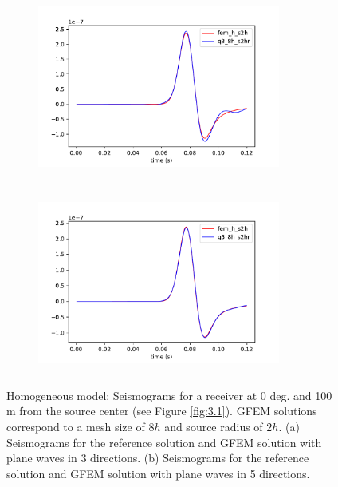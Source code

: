  \begin{figure}[h!]
 		\centering
		\begin{subfigure}{8cm}
				\includegraphics[width=8cm, height=6cm]{Thesis_Edith/figures/homo/homo_waves/fem_q3_8h_2hr_r100_0deg.pdf}
			     \caption{}
		\end{subfigure}
        \hspace{0.25cm}
		\begin{subfigure}{8cm}
				\includegraphics[width=8cm, height=6cm]{Thesis_Edith/figures/homo/homo_waves/fem_q5_8h_2hr_r100_0deg.pdf}
			   \caption{}
		\end{subfigure}
 
	\caption{Homogeneous model: Seismograms for a receiver at 0 deg. and 100 m from the source center (see Figure \ref{fig:3.1}). GFEM solutions correspond to a mesh size of $8h$ and source radius of $2h$. (a) Seismograms for the reference solution and GFEM solution with plane waves in 3 directions. (b) Seismograms for the  reference solution and GFEM solution with plane waves in 5 directions.}  
	\label{fig:3.7}
\end{figure}

